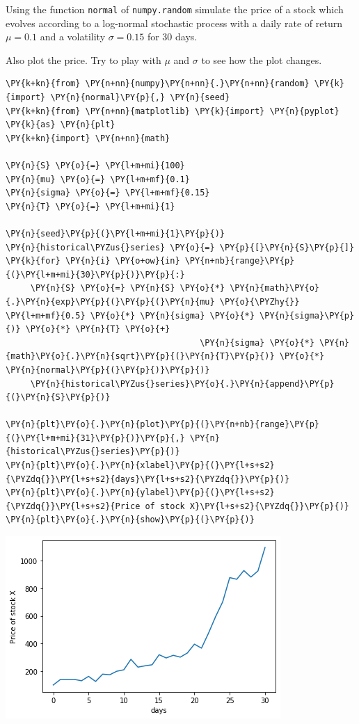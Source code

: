 \begin{Exercise}[title={(Stochastic Process Simulation)}]
Using the function \texttt{normal} of \texttt{numpy.random} simulate the price of a stock which evolves according to a log-normal stochastic process with a daily rate of return \(\mu=0.1\) and a volatility \(\sigma=0.15\) for 30 days.

Also plot the price. Try to play with \(\mu\) and \(\sigma\) to see how the plot changes.
\end{Exercise}
\vfill
\begin{Answer}
\begin{tcolorbox}[size=fbox, boxrule=1pt, colback=cellbackground, colframe=cellborder]
\begin{Verbatim}[commandchars=\\\{\}]
\PY{k+kn}{from} \PY{n+nn}{numpy}\PY{n+nn}{.}\PY{n+nn}{random} \PY{k}{import} \PY{n}{normal}\PY{p}{,} \PY{n}{seed}
\PY{k+kn}{from} \PY{n+nn}{matplotlib} \PY{k}{import} \PY{n}{pyplot} \PY{k}{as} \PY{n}{plt}
\PY{k+kn}{import} \PY{n+nn}{math}
 
\PY{n}{S} \PY{o}{=} \PY{l+m+mi}{100}
\PY{n}{mu} \PY{o}{=} \PY{l+m+mf}{0.1}
\PY{n}{sigma} \PY{o}{=} \PY{l+m+mf}{0.15}
\PY{n}{T} \PY{o}{=} \PY{l+m+mi}{1}
 
\PY{n}{seed}\PY{p}{(}\PY{l+m+mi}{1}\PY{p}{)}
\PY{n}{historical\PYZus{}series} \PY{o}{=} \PY{p}{[}\PY{n}{S}\PY{p}{]}
\PY{k}{for} \PY{n}{i} \PY{o+ow}{in} \PY{n+nb}{range}\PY{p}{(}\PY{l+m+mi}{30}\PY{p}{)}\PY{p}{:}
     \PY{n}{S} \PY{o}{=} \PY{n}{S} \PY{o}{*} \PY{n}{math}\PY{o}{.}\PY{n}{exp}\PY{p}{(}\PY{p}{(}\PY{n}{mu} \PY{o}{\PYZhy{}} \PY{l+m+mf}{0.5} \PY{o}{*} \PY{n}{sigma} \PY{o}{*} \PY{n}{sigma}\PY{p}{)} \PY{o}{*} \PY{n}{T} \PY{o}{+}
                                       \PY{n}{sigma} \PY{o}{*} \PY{n}{math}\PY{o}{.}\PY{n}{sqrt}\PY{p}{(}\PY{n}{T}\PY{p}{)} \PY{o}{*} \PY{n}{normal}\PY{p}{(}\PY{p}{)}\PY{p}{)}
     \PY{n}{historical\PYZus{}series}\PY{o}{.}\PY{n}{append}\PY{p}{(}\PY{n}{S}\PY{p}{)}
     
\PY{n}{plt}\PY{o}{.}\PY{n}{plot}\PY{p}{(}\PY{n+nb}{range}\PY{p}{(}\PY{l+m+mi}{31}\PY{p}{)}\PY{p}{,} \PY{n}{historical\PYZus{}series}\PY{p}{)}
\PY{n}{plt}\PY{o}{.}\PY{n}{xlabel}\PY{p}{(}\PY{l+s+s2}{\PYZdq{}}\PY{l+s+s2}{days}\PY{l+s+s2}{\PYZdq{}}\PY{p}{)}
\PY{n}{plt}\PY{o}{.}\PY{n}{ylabel}\PY{p}{(}\PY{l+s+s2}{\PYZdq{}}\PY{l+s+s2}{Price of stock X}\PY{l+s+s2}{\PYZdq{}}\PY{p}{)}
\PY{n}{plt}\PY{o}{.}\PY{n}{show}\PY{p}{(}\PY{p}{)}
\end{Verbatim}
\end{tcolorbox}

\begin{center}
  \includegraphics{figures/lesson6_solutions_5_0.png}
\end{center}
\end{Answer}
